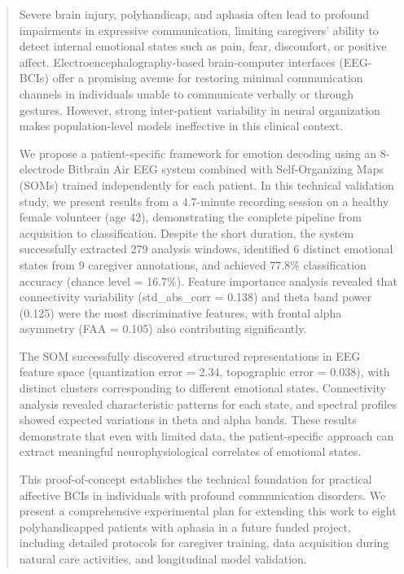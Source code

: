 \begin{abstract}
Severe brain injury, polyhandicap, and aphasia often lead to profound impairments in expressive communication, limiting caregivers' ability to detect internal emotional states such as pain, fear, discomfort, or positive affect. Electroencephalography-based brain-computer interfaces (EEG-BCIs) offer a promising avenue for restoring minimal communication channels in individuals unable to communicate verbally or through gestures. However, strong inter-patient variability in neural organization makes population-level models ineffective in this clinical context. 

We propose a patient-specific framework for emotion decoding using an 8-electrode Bitbrain Air EEG system combined with Self-Organizing Maps (SOMs) trained independently for each patient. In this technical validation study, we present results from a 4.7-minute recording session on a healthy female volunteer (age 42), demonstrating the complete pipeline from acquisition to classification. Despite the short duration, the system successfully extracted 279 analysis windows, identified 6 distinct emotional states from 9 caregiver annotations, and achieved 77.8\% classification accuracy (chance level = 16.7\%). Feature importance analysis revealed that connectivity variability (std\_abs\_corr = 0.138) and theta band power (0.125) were the most discriminative features, with frontal alpha asymmetry (FAA = 0.105) also contributing significantly.

The SOM successfully discovered structured representations in EEG feature space (quantization error = 2.34, topographic error = 0.038), with distinct clusters corresponding to different emotional states. Connectivity analysis revealed characteristic patterns for each state, and spectral profiles showed expected variations in theta and alpha bands. These results demonstrate that even with limited data, the patient-specific approach can extract meaningful neurophysiological correlates of emotional states.

This proof-of-concept establishes the technical foundation for practical affective BCIs in individuals with profound communication disorders. We present a comprehensive experimental plan for extending this work to eight polyhandicapped patients with aphasia in a future funded project, including detailed protocols for caregiver training, data acquisition during natural care activities, and longitudinal model validation.
\end{abstract}